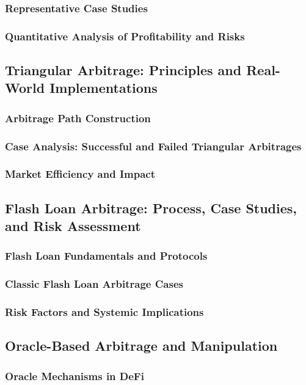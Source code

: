\documentclass[conference]{IEEEtran}
\begin{document}
    \subsubsection{Representative Case Studies}
    \subsubsection{Quantitative Analysis of Profitability and Risks}
\subsection{Triangular Arbitrage: Principles and Real-World Implementations}
    \subsubsection{Arbitrage Path Construction}
    \subsubsection{Case Analysis: Successful and Failed Triangular Arbitrages}
    \subsubsection{Market Efficiency and Impact}
\subsection{Flash Loan Arbitrage: Process, Case Studies, and Risk Assessment}
    \subsubsection{Flash Loan Fundamentals and Protocols}
    \subsubsection{Classic Flash Loan Arbitrage Cases}
    \subsubsection{Risk Factors and Systemic Implications}
\subsection{Oracle-Based Arbitrage and Manipulation}
    \subsubsection{Oracle Mechanisms in DeFi}
\end{document}
